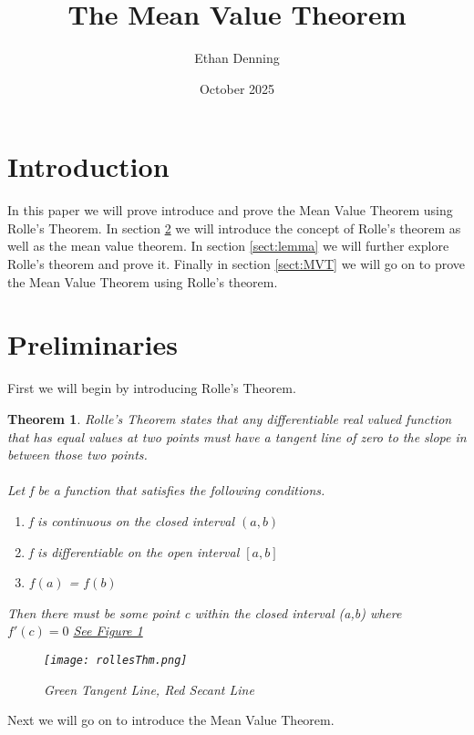 \documentclass{article}
\title{The Mean Value Theorem}
\author{Ethan Denning}
\date{October 2025}
\theoremstyle{plain}
\newtheorem{thm}{Theorem}
\theoremstyle{definition}
\begin{document}
\maketitle

\section{Introduction}
In this paper we will prove introduce and prove the Mean Value Theorem using Rolle's Theorem. In section \ref{sect:prelim} we will introduce the concept of Rolle's theorem as well as the mean value theorem. In section \ref{sect:lemma} we will further explore Rolle's theorem and prove it. Finally in section \ref{sect:MVT} we will go on to prove the Mean Value Theorem using Rolle's theorem. 

\section{Preliminaries} \label{sect:prelim}
First we will begin by introducing Rolle's Theorem.
    \begin{thm} \label{rolleThm}
        \emph{Rolle's Theorem states that any differentiable real valued function that has equal values at two points must have a tangent line of zero to the slope in between those two points.} \\\\
        Let f be a function that satisfies the following conditions.
        \begin{enumerate}
            \item f is continuous on the closed interval $(a,b)$
            \item f is differentiable on the open interval $[a,b]$
            \item $f(a)$ = $f(b)$
        \end{enumerate}
        Then there must be some point c within the closed interval (a,b) where $f'(c) = 0$ \href{fig:rolles}{See Figure 1}
    \begin{figure}[H]
        \centering
        \texttt{[image: rollesThm.png]}
        \caption{Green Tangent Line, Red Secant Line}
        \label{fig:rolles}
    \end{figure}
    
    \end{thm}
Next we will go on to introduce the Mean Value Theorem.
\end{document}
